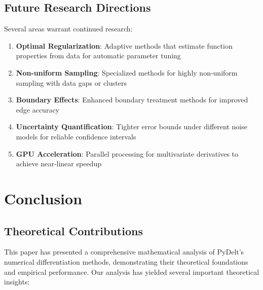 \documentclass[10pt,journal,compsoc]{IEEEtran}
\begin{document}
\subsection{Future Research Directions}

Several areas warrant continued research:

\begin{enumerate}
    \item \textbf{Optimal Regularization}: Adaptive methods that estimate function properties from data for automatic parameter tuning
    
    \item \textbf{Non-uniform Sampling}: Specialized methods for highly non-uniform sampling with data gaps or clusters
    
    \item \textbf{Boundary Effects}: Enhanced boundary treatment methods for improved edge accuracy
    
    \item \textbf{Uncertainty Quantification}: Tighter error bounds under different noise models for reliable confidence intervals
    
    \item \textbf{GPU Acceleration}: Parallel processing for multivariate derivatives to achieve near-linear speedup
\end{enumerate}

\section{Conclusion}

\subsection{Theoretical Contributions}

This paper has presented a comprehensive mathematical analysis of PyDelt's numerical differentiation methods, demonstrating their theoretical foundations and empirical performance. Our analysis has yielded several important theoretical insights:
\end{document}
